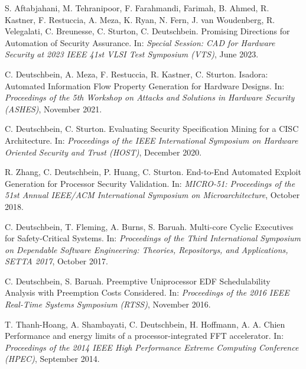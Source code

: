 \documentclass[10pt]{article}
\begin{document}
\begin{bibenum}


	\item S. Aftabjahani, M. Tehranipoor, F. Farahmandi, Farimah, B. Ahmed, R. Kastner, F. Restuccia, A. Meza, K.  Ryan, N. Fern, J. van Woudenberg, R. Velegalati, C. Breunesse, C. Sturton, C. Deutschbein.
		Promising Directions for Automation of Security Assurance.
		In: \emph{Special Session: CAD for Hardware Security at 2023 IEEE 41st VLSI Test Symposium (VTS)},
		June 2023. \\

	\item C. Deutschbein, A. Meza, F. Restuccia, R. Kastner, C. Sturton.
		Isadora: Automated Information Flow Property Generation for Hardware Designs.
		In: \emph{Proceedings of the 5th Workshop on Attacks and Solutions in Hardware Security (ASHES)},
		November 2021. \\

    \item C. Deutschbein, C. Sturton.
        Evaluating Security Specification Mining for a CISC Architecture.
        In: \emph{Proceedings of the IEEE International Symposium on Hardware Oriented Security and Trust (HOST)},
            December 2020. \\

    \item R. Zhang, C. Deutschbein, P. Huang, C. Sturton.
        End-to-End Automated Exploit Generation for Processor Security Validation.
        In: \emph{MICRO-51: Proceedings of the 51st Annual IEEE/ACM International Symposium on Microarchitecture},
            October 2018. \\
            
    \item C. Deutschbein, T. Fleming, A. Burns, S. Baruah.
        Multi-core Cyclic Executives for Safety-Critical Systems.
        In: \emph{Proceedings of the Third International Symposium on Dependable Software Engineering: Theories, Repositorys, and Applications, SETTA 2017},
            October 2017. \\

    \item C. Deutschbein, S. Baruah.
        Preemptive Uniprocessor EDF Schedulability Analysis with Preemption Costs Considered.
        In: \emph{Proceedings of the 2016 IEEE Real-Time Systems Symposium (RTSS)},
            November 2016. \\

    \item T. Thanh-Hoang, A. Shambayati, C. Deutschbein, H. Hoffmann, A. A. Chien
        Performance and energy limits of a processor-integrated FFT accelerator.
        In: \emph{Proceedings of the 2014 IEEE High Performance Extreme Computing Conference (HPEC)},
            September 2014. \\

\end{bibenum}
\end{document}

